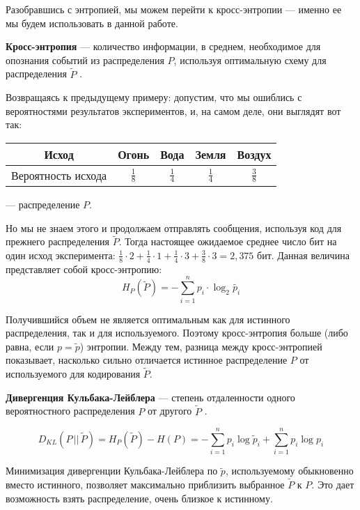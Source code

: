 Разобравшись с энтропией, мы можем перейти к кросс-энтропии --- именно ее мы будем использовать в данной работе.

{\bfseries Кросс-энтропия} --- количество информации, в среднем, необходимое для опознания событий из распределения $P$, используя оптимальную схему для распределения $\tilde P$ \cite{entropy}.

Возвращаясь к предыдущему примеру: допустим, что мы ошиблись с вероятностями результатов экспериментов, и, на самом деле, они выглядят вот так:

\begin{center}
\setlength{\extrarowheight}{3mm}
\begin{tabular}{|c|c|c|c|c|}
	\hline
	Исход & Огонь & Вода & Земля & Воздух\\[2mm]
	\hline
	Вероятность исхода & $\displaystyle\frac{1}{8}$ & $\displaystyle\frac{1}{4}$ & $\displaystyle\frac{1}{4}$ & $\displaystyle\frac{3}{8}$\\[3mm]
	\hline
\end{tabular}
\end{center}

--- распределение $P$.

Но мы не знаем этого и продолжаем отправлять сообщения, используя код для прежнего распределения $\tilde P$. Тогда настоящее ожидаемое среднее число бит на один исход эксперимента: $\displaystyle\frac{1}{8} \cdot 2  + \frac{1}{4} \cdot 1  + \frac{1}{4} \cdot 3 + \frac{3}{8} \cdot 3 = 2,375$ бит. Данная величина представляет собой кросс-энтропию:
\begin{equation}
	H_P(\tilde P) = - \sum_{i=1}^{n} p_i \cdot \log_2 \tilde{p_i}
\end{equation}

Получившийся объем не является оптимальным как для истинного распределения, так и для используемого. Поэтому кросс-энтропия больше (либо равна, если $p = \tilde p$) энтропии. Между тем, разница между кросс-энтропией показывает, насколько сильно отличается истинное распределение $P$ от используемого для кодирования $\tilde P$.

{\bfseries Дивергенция Кульбака-Лейблера} --- степень отдаленности одного вероятностного распределения $P$ от другого $\tilde P$ \cite{entropy}.

\begin{equation}
	D_{KL}(P\, ||\, \tilde P)= H_P(\tilde P) - H(P) = - \sum\limits_{i=1}^n p_i\log \tilde p_i + \sum\limits_{i=1}^n p_i\log p_i
\end{equation}

Минимизация дивергенции Кульбака-Лейблера по $\tilde p$, используемому обыкновенно вместо истинного, позволяет максимально приблизить выбранное $\tilde P$ к $P$. Это дает возможность взять распределение, очень близкое к истинному.